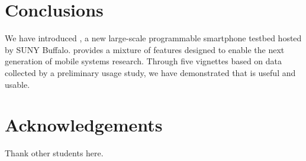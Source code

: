 \section{Conclusions}
\label{sec-conclusions}

We have introduced \PhoneLab{}, a new large-scale programmable smartphone
testbed hosted by SUNY Buffalo. \PhoneLab{} provides a mixture of features
designed to enable the next generation of mobile systems research. Through
five vignettes based on data collected by a preliminary usage study, we have
demonstrated that \PhoneLab{} is useful and usable.

\section*{Acknowledgements}

 Thank other students here.
